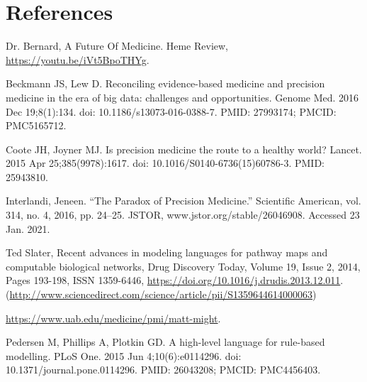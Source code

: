 \section*{References}

\newcommand{\source}[2]{
\item [({#1})]{#2}
}

\begin{description}[align=right]
\source{Bernard}{Dr. Bernard, A Future Of Medicine. Heme Review, \url{https://youtu.be/iVt5BpoTHYg}.}
\source{Beckmann}{Beckmann JS, Lew D. Reconciling evidence-based medicine and precision medicine in the era of big data: challenges and opportunities. Genome Med. 2016 Dec 19;8(1):134. doi: 10.1186/s13073-016-0388-7. PMID: 27993174; PMCID: PMC5165712.}
\source{Coote}{Coote JH, Joyner MJ. Is precision medicine the route to a healthy world? Lancet. 2015 Apr 25;385(9978):1617. doi: 10.1016/S0140-6736(15)60786-3. PMID: 25943810.}
\source{Interlandi}{Interlandi, Jeneen. “The Paradox of Precision Medicine.” Scientific American, vol. 314, no. 4, 2016, pp. 24–25. JSTOR, www.jstor.org/stable/26046908. Accessed 23 Jan. 2021.}
\source{Slater}{Ted Slater, Recent advances in modeling languages for pathway maps and computable biological networks, Drug Discovery Today, Volume 19, Issue 2, 2014, Pages 193-198, ISSN 1359-6446, \url{https://doi.org/10.1016/j.drudis.2013.12.011}. (\url{http://www.sciencedirect.com/science/article/pii/S1359644614000063})}
\source{Might}{\url{https://www.uab.edu/medicine/pmi/matt-might}.}
\source{Kappa}{Pedersen M, Phillips A, Plotkin GD. A high-level language for rule-based modelling. PLoS One. 2015 Jun 4;10(6):e0114296. doi: 10.1371/journal.pone.0114296. PMID: 26043208; PMCID: PMC4456403.}
\end{description}
